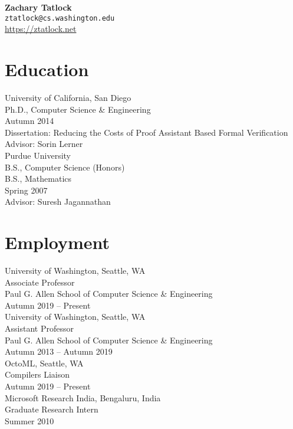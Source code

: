 \documentclass[10pt]{article}
\begin{document}
{\LARGE \textbf{Zachary Tatlock}} \\
\texttt{ztatlock@cs.washington.edu} \\
\url{https://ztatlock.net}


\section*{Education}

University of California, San Diego \\
Ph.D., Computer Science \& Engineering \\
Autumn 2014 \\
Dissertation: Reducing the Costs of Proof Assistant Based Formal Verification \\
Advisor: Sorin Lerner \\

Purdue University \\
B.S., Computer Science (Honors) \\
B.S., Mathematics \\
Spring 2007 \\
Advisor: Suresh Jagannathan


\section*{Employment}

University of Washington, Seattle, WA \\
Associate Professor \\
Paul G. Allen School of Computer Science \& Engineering \\
Autumn 2019 -- Present \\

University of Washington, Seattle, WA \\
Assistant Professor \\
Paul G. Allen School of Computer Science \& Engineering \\
Autumn 2013 -- Autumn 2019 \\

OctoML, Seattle, WA \\
Compilers Liaison \\
Autumn 2019 -- Present \\

Microsoft Research India, Bengaluru, India \\
Graduate Research Intern \\
Summer 2010
\end{document}
